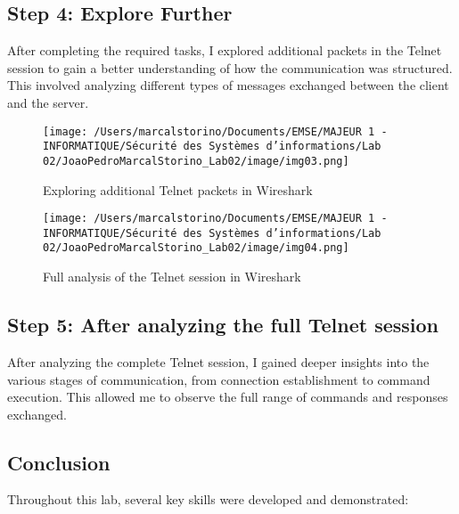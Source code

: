 \documentclass[a4paper,12pt]{article} %
\begin{document}
\subsection*{Step 4: Explore Further}
After completing the required tasks, I explored additional packets in the Telnet session to gain a better understanding of how the communication was structured. This involved analyzing different types of messages exchanged between the client and the server.

\begin{figure}[h!]
\centering
\texttt{[image: /Users/marcalstorino/Documents/EMSE/MAJEUR 1 - INFORMATIQUE/Sécurité des Systèmes d'informations/Lab 02/JoaoPedroMarcalStorino\_Lab02/image/img03.png]} %
\caption{Exploring additional Telnet packets in Wireshark}
\end{figure}

\begin{figure}[h!]
\centering
\texttt{[image: /Users/marcalstorino/Documents/EMSE/MAJEUR 1 - INFORMATIQUE/Sécurité des Systèmes d'informations/Lab 02/JoaoPedroMarcalStorino\_Lab02/image/img04.png]} %
\caption{Full analysis of the Telnet session in Wireshark}
\end{figure}

\subsection*{Step 5: After analyzing the full Telnet session}
After analyzing the complete Telnet session, I gained deeper insights into the various stages of communication, from connection establishment to command execution. This allowed me to observe the full range of commands and responses exchanged.

\subsection*{Conclusion}
Throughout this lab, several key skills were developed and demonstrated:
\end{document}
